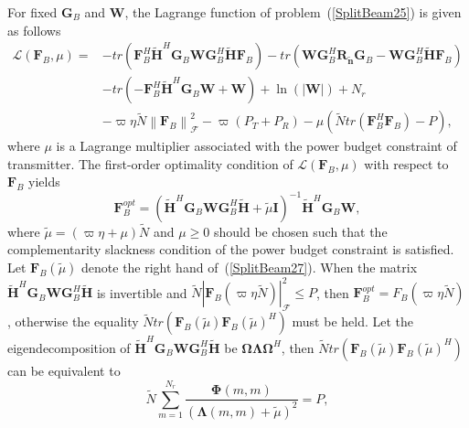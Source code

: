 \documentclass[11pt,draftcls,onecolumn]{IEEEtran}
\begin{document}
For fixed $\bm{G}_{B}$ and $\bm{W}$, the Lagrange function of problem~(\ref{SplitBeam25}) is given as follows
\begin{equation}\label{SplitBeam26}
\begin{split}
\mathcal{L}\left(\bm{F}_{B},\mu\right)=&-tr\left(\bm{F}_{B}^{H}\widetilde{\bm{H}}^{H}\bm{G}_{B}\bm{W}\bm{G}_{B}^{H}\widetilde{\bm{H}}\bm{F}_{B}\right)
-tr\left(\bm{W}\bm{G}_{B}^{H}\bm{R}_{\widetilde{\bm{n}}}\bm{G}_{B}
-\bm{W}\bm{G}_{B}^{H}\widetilde{\bm{H}}\bm{F}_{B}\right)\\
&-tr\left(-\bm{F}_{B}^{H}\widetilde{\bm{H}}^{H}\bm{G}_{B}\bm{W}+\bm{W}\right)
+\ln\left(\left|\bm{W}\right|\right)+N_{r}\\
&-\varpi\eta\widetilde{N}\left\|\bm{F}_{B}\right\|_{\mathcal{F}}^{2}-\varpi\left(P_{T}+P_{R}\right)-
\mu\left(\widetilde{N}tr\left(\bm{F}_{B}^{H}\bm{F}_{B}\right)-P\right),
\end{split}
\end{equation}
where $\mu$ is a Lagrange multiplier associated with the power budget constraint of transmitter. The first-order optimality condition of $\mathcal{L}\left(\bm{F}_{B},\mu\right)$ with respect to $\bm{F}_{B}$ yields
\begin{equation}\label{SplitBeam27}
\bm{F}_{B}^{opt}=\left(\widetilde{\bm{H}}^{H}\bm{G}_{B}\bm{W}\bm{G}_{B}^{H}\widetilde{\bm{H}}+\widetilde{\mu}\bm{I}\right)^{-1}
\widetilde{\bm{H}}^{H}\bm{G}_{B}\bm{W},
\end{equation}
where $\widetilde{\mu}=\left(\varpi\eta+\mu\right)\widetilde{N}$ and $\mu\geq 0$ should be chosen such that the complementarity slackness condition of the power budget constraint is satisfied. Let $\bm{F}_{B}\left(\widetilde{\mu}\right)$ denote the right hand of~(\ref{SplitBeam27}). When the matrix $\widetilde{\bm{H}}^{H}\bm{G}_{B}\bm{W}\bm{G}_{B}^{H}\widetilde{\bm{H}}$ is invertible and $\widetilde{N}\left|\bm{F}_{B}\left(\varpi\eta\widetilde{N}\right)\right|_{\mathcal{F}}^{2}\leq P$, then $\bm{F}_{B}^{opt}=F_{B}\left(\varpi\eta\widetilde{N}\right)$, otherwise the equality $\widetilde{N}tr\left(\bm{F}_{B}\left(\widetilde{\mu}\right)\bm{F}_{B}\left(\widetilde{\mu}\right)^{H}\right)$ must be held. Let the eigendecomposition of $\widetilde{\bm{H}}^{H}\bm{G}_{B}\bm{W}\bm{G}_{B}^{H}\widetilde{\bm{H}}$ be $\bm{\Omega}\bm{\Lambda}\bm{\Omega}^{H}$, then $\widetilde{N}tr\left(\bm{F}_{B}\left(\widetilde{\mu}\right)\bm{F}_{B}\left(\widetilde{\mu}\right)^{H}\right)$ can be equivalent to
\begin{equation}\label{SplitBeam28}
\widetilde{N}\sum\limits_{m=1}^{N_{r}}\frac{\bm{\Phi}\left({m,m}\right)}
{\left(\bm{\Lambda}\left({m,m}\right)+\widetilde{\mu}\right)^{2}}=P,
\end{equation}
\end{document}
